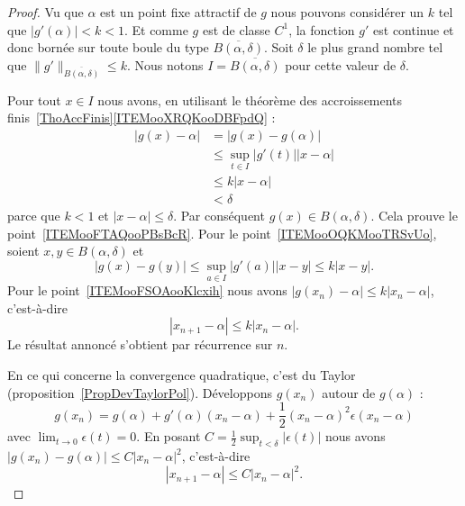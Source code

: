 \begin{proof}
	Vu que \( \alpha\) est un point fixe attractif de \( g\) nous pouvons considérer un \( k\) tel que \( | g'(\alpha) |<k<1\). Et comme \( g\) est de classe \( C^1\), la fonction \( g'\) est continue et donc bornée sur toute boule du type \( \overline{ B(\alpha,\delta) }\). Soit \( \delta\) le plus grand nombre tel que \( \| g' \|_{\overline{ B(\alpha,\delta) }}\leq k\). Nous notons \( I=\overline{ B(\alpha,\delta) } \) pour cette valeur de \( \delta\).

	Pour tout \( x\in I\) nous avons, en utilisant le théorème des accroissements finis~\ref{ThoAccFinis}\ref{ITEMooXRQKooDBFpdQ} :
	\begin{subequations}        \label{SUBEQooYXLHooSCnnRA}
		\begin{align}
			| g(x)-\alpha | & =| g(x)-g(\alpha) |                    \\
			                & \leq\sup_{t\in I}| g'(t) | |x-\alpha | \\
			                & \leq k| x-\alpha |                     \\
			                & <\delta
		\end{align}
	\end{subequations}
	parce que \( k<1\) et \(| x-\alpha |\leq \delta\). Par conséquent \( g(x)\in B(\alpha,\delta)\). Cela prouve le point~\ref{ITEMooFTAQooPBsBcR}. Pour le point~\ref{ITEMooOQKMooTRSvUo}, soient \( x,y\in B(\alpha,\delta)\) et
	\begin{equation}
		| g(x)-g(y) |\leq \sup_{a\in I}| g'(a) | |x-y |\leq k| x-y |.
	\end{equation}
	Pour le point~\ref{ITEMooFSOAooKlcxih} nous avons \( | g(x_n)-\alpha |\leq k| x_n-\alpha |\), c'est-à-dire
	\begin{equation}
		| x_{n+1}-\alpha |\leq k| x_n-\alpha |.
	\end{equation}
	Le résultat annoncé s'obtient par récurrence sur \( n\).

	En ce qui concerne la convergence quadratique, c'est du Taylor (proposition~\ref{PropDevTaylorPol}). Développons \( g(x_n)\) autour de \( g(\alpha)\) :
	\begin{equation}
		g(x_n)=g(\alpha)+g'(\alpha)(x_n-\alpha)+\frac{ 1 }{2}(x_n-\alpha)^2\epsilon(x_n-\alpha)
	\end{equation}
	avec \( \lim_{t\to 0} \epsilon(t)=0\). En posant \( C=\frac{ 1 }{2}\sup_{t<\delta}| \epsilon(t) | \) nous avons \( | g(x_n)-g(\alpha) |\leq C|x_n-\alpha  |^2\), c'est-à-dire
	\begin{equation}
		| x_{n+1}-\alpha |\leq C| x_n-\alpha |^2.
	\end{equation}
\end{proof}

